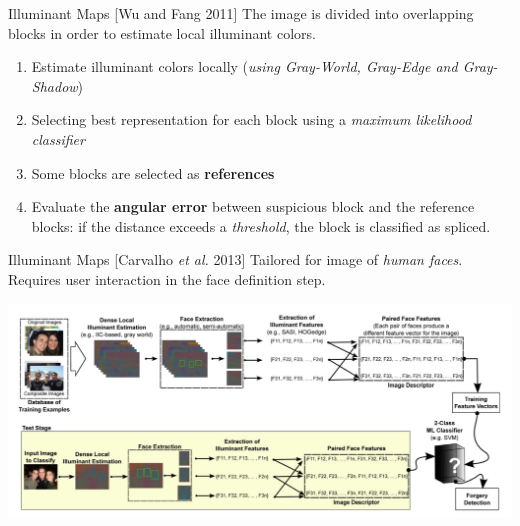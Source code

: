 \begin{tframe}{Illuminant Maps {\small [Wu and Fang 2011]}}
The image is divided into overlapping blocks in order to estimate local illuminant colors.
\vspace{0.2cm}
\begin{enumerate}
\item Estimate illuminant colors locally (\emph{using Gray-World, Gray-Edge and Gray-Shadow})
\vspace{0.1cm}

\item Selecting best representation for each block using a \emph{maximum likelihood classifier}
\vspace{0.1cm}

\item Some blocks are selected as \textbf{references}
\vspace{0.1cm}

\item Evaluate the \textbf{angular error} between suspicious block and the reference blocks: if the distance exceeds a \emph{threshold}, the block is classified as spliced.
\end{enumerate}
\vspace{0.1cm}
\end{tframe}

\begin{tframe}{Illuminant Maps {\small [Carvalho \emph{et al.} 2013]}}
\vspace{0.1cm}
Tailored for image of \emph{human faces}. Requires user interaction in the face definition step.
\vspace{0.4cm}
\begin{center}
\includegraphics[width=\textwidth]{images/carvalho.jpg}
\end{center}
\end{tframe}


